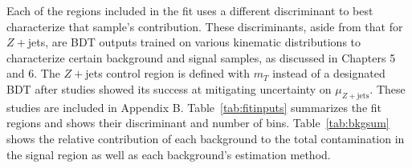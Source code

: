 Each of the regions included in the fit uses a different discriminant to best characterize that sample's contribution. These discriminants, aside from that for $Z+$jets, are BDT outputs trained on various kinematic distributions to characterize certain background and signal samples, as discussed in Chapters 5 and 6. The $Z+$jets control region is defined with $m_T$ instead of a designated BDT after studies showed its success at mitigating uncertainty on $\mu_{Z+\text{jets}}$. These studies are included in Appendix B. Table~\ref{tab:fitinputs} summarizes the fit regions and shows their discriminant and number of bins. Table~\ref{tab:bkgsum} shows the relative contribution of each background to the total contamination in the signal region as well as each background's estimation method. 
\begin{table}[!h]
  \begin{center}
    \caption{Fit categories, including SR and CRs, distributions and number of bins used in the fit.}
    \label{tab:fitinputs}
  \end{center}
\end{table}

\begin{table}[h!]
\centering
{}
\caption{Each background's relative size in the signal region as a percentage of the total background contributions and estimation method}
\label{tab:bkgsum}
\end{table}


